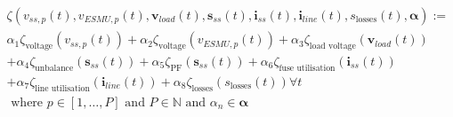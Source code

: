 \begin{multline}
	\zeta(v_{ss,p}(t), v_{ESMU,p}(t), \textbf{v}_{load}(t), \textbf{s}_{ss}(t), \textbf{i}_{ss}(t), \textbf{i}_{line}(t), s_\text{losses}(t), \boldsymbol{\alpha}) :=\\
	\alpha_1 \zeta_\text{voltage}(v_{ss,p}(t))%
	+ \alpha_2 \zeta_\text{voltage}(v_{ESMU,p}(t))%
	+ \alpha_3 \zeta_\text{load voltage}(\textbf{v}_{load}(t))\\
	+ \alpha_4 \zeta_\text{unbalance}(\textbf{s}_{ss}(t))%
	+ \alpha_5 \zeta_\text{PF}(\textbf{s}_{ss}(t))%
	+ \alpha_6 \zeta_\text{fuse utilisation}(\textbf{i}_{ss}(t))\\
	+ \alpha_7 \zeta_\text{line utilisation}(\textbf{i}_{line}(t))%
	+ \alpha_8 \zeta_\text{losses}(s_\text{losses}(t))%
	 \forall t \\
	 \text{ where } p \in [1, \dots, P] \text{ and } P \in \mathbb{N} \text{ and } \alpha_n \in \boldsymbol{\alpha}
\label{ch1:equ:weighted-sum-cost-function}
\end{multline}